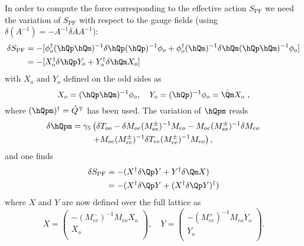In order to compute the force corresponding to the effective
action $S_\mathrm{PF}$ we need the variation of $S_\mathrm{PF}$ with
respect to the gauge fields 
(using $\delta (A^{-1})=-A^{-1}\delta A A^{-1}$):
\begin{equation}
  \label{eq:eosw5}
  \begin{split}
    \delta S_\mathrm{PF} &= -[\phi_o^\dagger (\hQp \hQm)^{-1}\delta \hQp(\hQp)^{-1}\phi_o +
    \phi_o^\dagger(\hQm)^{-1}\delta \hQm (\hQp \hQm)^{-1} \phi_o ] \\
     &= -[X_o^\dagger \delta \hQp Y_o + Y_o^\dagger \delta\hQm X_o]
  \end{split}
\end{equation}
with $X_o$ and $Y_o$ defined on the odd sides as 
\begin{equation}
  \label{eq:eosw6}
  X_o = (\hQp \hQm)^{-1} \phi_o,\quad Y_o = (\hQp)^{-1}\phi_o=\hat
  \Qm X_o\ ,
\end{equation}
where $(\hQpm)^\dagger = \hat Q^\mp$ has been used. The variation of
$\hQpm$ reads
\begin{equation}
  \label{eq:eosw7}
  \begin{split}
    \delta \hQpm = \gamma_5 & \left( \delta T_{oo}-\delta M_{oe}(M_{ee}^\pm )^{-1}M_{eo} -
      M_{oe}(M_{ee}^\pm )^{-1}\delta M_{eo}\right. \\
  &\left. + M_{oe}(M_{ee}^\pm )^{-1} \delta T_{ee} (M_{ee}^\pm )^{-1} M_{eo}\right),
  \end{split}
\end{equation}
and one finds
\begin{equation}
  \label{eq:eosw8}
  \begin{split}
    \delta S_\mathrm{PF} &= -(X^\dagger\delta \Qp Y + Y^\dagger\delta \Qm X) \\
    &= -(X^\dagger\delta \Qp Y +(X^\dagger\delta \Qp Y)^\dagger)
  \end{split}
\end{equation}
where $X$ and $Y$ are now defined over the full lattice as
\begin{equation}
  \label{eq:eosw9}
  X = 
  \begin{pmatrix}
    -(M_{ee}^-)^{-1}M_{eo}X_o \\ X_o\\
  \end{pmatrix},\quad
  Y = 
  \begin{pmatrix}
    -(M_{ee}^+)^{-1}M_{eo}Y_o \\ Y_o\\
  \end{pmatrix}.
\end{equation}
